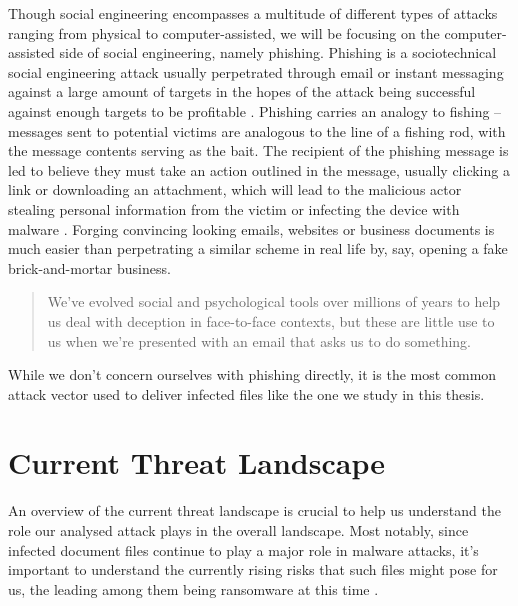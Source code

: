 Though social engineering encompasses a multitude of different types of attacks ranging from physical to
computer-assisted, we will be focusing on the computer-assisted side of social engineering, namely phishing. %
Phishing is a sociotechnical social engineering attack usually perpetrated through email or instant messaging 
against a large amount of targets in the hopes of the attack being successful against enough targets to be 
profitable \cite{advanced-social-engineering-attacks}. 
Phishing carries an analogy to fishing -- messages sent to potential victims are analogous to the line 
of a fishing rod, with the message contents serving as the bait. 
The recipient of the phishing message is led to believe they must take an action outlined in the message,
usually clicking a link or downloading an attachment, which will lead to the malicious actor stealing
personal information from the victim or infecting the device with malware \cite{state-of-phishing}.
Forging convincing looking emails, websites or business documents is much easier than perpetrating a similar 
scheme in real life by, say, opening a fake brick-and-mortar business.
\begin{quote}
  We’ve evolved social and psychological tools over millions of years to help
  us deal with deception in face-to-face contexts, but these are little use to us
  when we’re presented with an email that asks us to do something. \cite{anderson-security-engineering}
\end{quote}
While we don't concern ourselves with phishing directly, it is the most common attack vector used to deliver
infected files like the one we study in this thesis.  %

\section{Current Threat Landscape}
An overview of the current threat landscape is crucial to help us understand the role our analysed
attack plays in the overall landscape. Most notably, since infected document files continue to play 
a major role in malware attacks, it's important to understand the currently rising risks that such
files might pose for us, the leading among them being ransomware at this time \cite{enisa_threat_landscape}.

